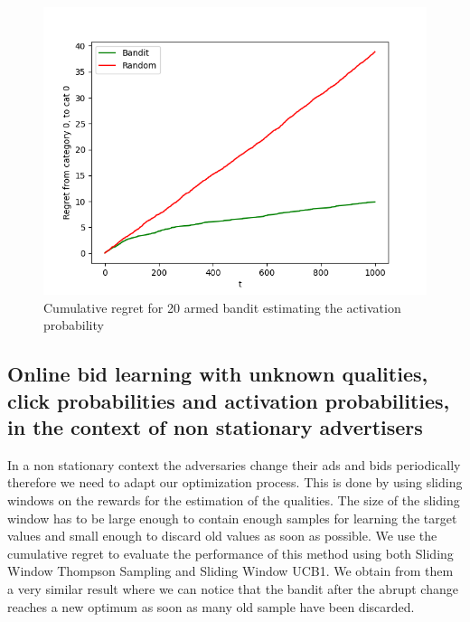 \documentclass{article}
\begin{document}
\begin{figure}[H]
    \centering
    \includegraphics[width=0.66\linewidth]{images/activation 20 arms.png}
    \caption{Cumulative regret for 20 armed bandit estimating the activation probability}
\end{figure}


\subsection{Online bid learning with unknown qualities, click probabilities and activation probabilities, in the context of non stationary advertisers}
In a non stationary context the adversaries change their ads and bids periodically therefore we need to adapt our optimization process. This is done by using sliding windows on the rewards for the estimation of the qualities. The size of the sliding window has to be large enough to contain enough samples for learning the target values and small enough to discard old values as soon as possible. We use the cumulative regret to evaluate the performance of this method using both Sliding Window Thompson Sampling and Sliding Window UCB1. We obtain from them a very similar result where we can notice that the bandit after the abrupt change reaches a new optimum as soon as many old sample have been discarded.
\end{document}
